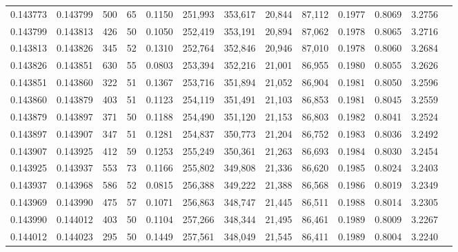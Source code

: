\begin{tabular}{rrrrrrrrrrrrr}
0.143773 & 0.143799 &   500 &  65 &                                     0.1150 & 251,993 & 353,617 &  20,844 &  87,112 & 0.1977 & 0.8069 & 3.2756 \\
0.143799 & 0.143813 &   426 &  50 &                                     0.1050 & 252,419 & 353,191 &  20,894 &  87,062 & 0.1978 & 0.8065 & 3.2716 \\
0.143813 & 0.143826 &   345 &  52 &                                     0.1310 & 252,764 & 352,846 &  20,946 &  87,010 & 0.1978 & 0.8060 & 3.2684 \\
0.143826 & 0.143851 &   630 &  55 &                                     0.0803 & 253,394 & 352,216 &  21,001 &  86,955 & 0.1980 & 0.8055 & 3.2626 \\
0.143851 & 0.143860 &   322 &  51 &                                     0.1367 & 253,716 & 351,894 &  21,052 &  86,904 & 0.1981 & 0.8050 & 3.2596 \\
0.143860 & 0.143879 &   403 &  51 &                                     0.1123 & 254,119 & 351,491 &  21,103 &  86,853 & 0.1981 & 0.8045 & 3.2559 \\
0.143879 & 0.143897 &   371 &  50 &                                     0.1188 & 254,490 & 351,120 &  21,153 &  86,803 & 0.1982 & 0.8041 & 3.2524 \\
0.143897 & 0.143907 &   347 &  51 &                                     0.1281 & 254,837 & 350,773 &  21,204 &  86,752 & 0.1983 & 0.8036 & 3.2492 \\
0.143907 & 0.143925 &   412 &  59 &                                     0.1253 & 255,249 & 350,361 &  21,263 &  86,693 & 0.1984 & 0.8030 & 3.2454 \\
0.143925 & 0.143937 &   553 &  73 &                                     0.1166 & 255,802 & 349,808 &  21,336 &  86,620 & 0.1985 & 0.8024 & 3.2403 \\
0.143937 & 0.143968 &   586 &  52 &                                     0.0815 & 256,388 & 349,222 &  21,388 &  86,568 & 0.1986 & 0.8019 & 3.2349 \\
0.143969 & 0.143990 &   475 &  57 &                                     0.1071 & 256,863 & 348,747 &  21,445 &  86,511 & 0.1988 & 0.8014 & 3.2305 \\
0.143990 & 0.144012 &   403 &  50 &                                     0.1104 & 257,266 & 348,344 &  21,495 &  86,461 & 0.1989 & 0.8009 & 3.2267 \\
0.144012 & 0.144023 &   295 &  50 &                                     0.1449 & 257,561 & 348,049 &  21,545 &  86,411 & 0.1989 & 0.8004 & 3.2240 \\

\end{tabular}
